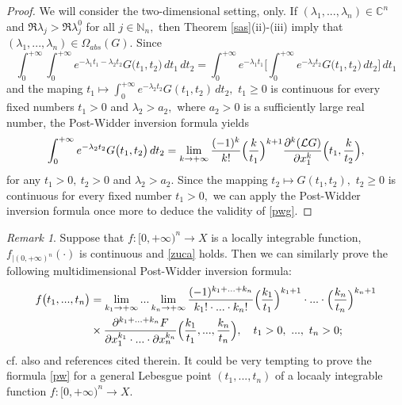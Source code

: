 \documentclass{amsart}
\theoremstyle{definition}
\theoremstyle{remark}
\newtheorem{rem}[thm]{Remark}
\numberwithin{equation}{section}
\begin{document}
\begin{proof}
We will consider the two-dimensional setting, only. If $(\lambda_{1},...,\lambda_{n})\in {\mathbb C}^{n}$ and $\Re \lambda_{j}>\Re \lambda_{j}^{0}$ for all $j\in {\mathbb N}_{n},$ then Theorem \ref{sas}(ii)-(iii) imply that $(\lambda_{1},...,\lambda_{n})\in \Omega_{abs}(G).$ 
Since
$$
\int^{+\infty}_{0}\int^{+\infty}_{0}e^{-\lambda_{1}t_{1}-\lambda_{2}t_{2}}G\bigl( t_{1},t_{2}\bigr)\, dt_{1}\, dt_{2}=\int^{+\infty}_{0}e^{-\lambda_{1}t_{1}}\Biggl[\int^{+\infty}_{0} e^{-\lambda_{2}t_{2}}G\bigl( t_{1},t_{2}\bigr)\, dt_{2}\Biggr] \, dt_{1}
$$
and the maping $t_{1}\mapsto \int^{+\infty}_{0} e^{-\lambda_{2}t_{2}}G( t_{1},t_{2})\, dt_{2},$ $t_{1}\geq 0$ is continuous for every fixed numbers $t_{1}>0$ and $\lambda_{2}>a_{2},$ where $a_{2}>0$ is a sufficiently large real number, the Post-Widder inversion formula \cite[Theorem 1.4.3]{FKP} yields
\begin{align*}
\int^{+\infty}_{0} e^{-\lambda_{2}t_{2}}G\bigl( t_{1},t_{2}\bigr)\, dt_{2}=\lim_{k\rightarrow +\infty}\frac{(-1)^{k}}{k! }\Bigl( \frac{k}{t_{1}}\Bigr)^{k+1} \frac{\partial^{k}({\mathcal L G})}{\partial x_{1}^{k}}\Bigl( t_{1},\frac{k}{t_{2}}\Bigr),
\end{align*}
for any $ t_{1}>0,\ t_{2}>0$ and $\lambda_{2}>a_{2}.$
Since the mapping $t_{2}\mapsto G( t_{1},t_{2}),$ $t_{2}\geq 0$ is continuous for every fixed number $t_{1}>0,$ we can apply the Post-Widder inversion formula \cite[Theorem 1.4.3]{FKP} once more to deduce the validity of \eqref{pwg}.
\end{proof}

\begin{rem}
Suppose that  
$f: [0,+\infty)^{n}\rightarrow X$ is a locally integrable function, $f_{| (0,+\infty)^{n}}(\cdot)$ is continuous and \eqref{zuca} holds. 
Then we can similarly prove the following multidimensional Post-Widder inversion formula:
\begin{align}\notag
f\bigl(t_{1},...,t_{n}\bigr)&=\lim_{k_{1}\rightarrow +\infty}...\lim_{k_{n}\rightarrow +\infty}\frac{(-1)^{k_{1}+...+k_{n}}}{k_{1}! \cdot ... \cdot k_{n}!}\Bigl( \frac{k_{1}}{t_{1}}\Bigr)^{k_{1}+1}\cdot ... \cdot \Bigl( \frac{k_{n}}{t_{n}}\Bigr)^{k_{n}+1}\\\label{pw}& \times \frac{\partial^{k_{1}+...+k_{n}}F}{\partial x_{1}^{k_{1}}\cdot ... \cdot \partial x_{n}^{k_{n}}}\Bigl( \frac{k_{1}}{t_{1}},...,\frac{k_{n}}{t_{n}}\Bigr),\quad t_{1}>0,\ ...,\ t_{n}>0;
\end{align}
cf. also \cite{iranac,cohen,ditkin,frolov} and references cited therein. It could be very tempting to prove the fiormula \eqref{pw} for a general Lebesgue point $(t_{1},...,t_{n})$ of a locaaly integrable function $f: [0,+\infty)^{n}\rightarrow X$.
\end{rem}
\end{document}
